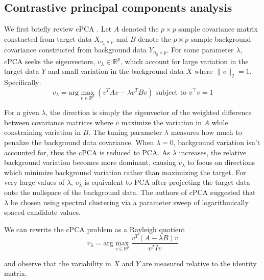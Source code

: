 \documentclass[12pt]{article}
\begin{document}
\subsection{Contrastive principal components analysis}
We first briefly review cPCA \cite{Abid}. Let $A$ denoted the $p\times p$ sample covariance matrix constucted from target data $X_{n_x \times p}$ and $B$ denote the $p\times p$ sample background covariance constructed from background data $Y_{n_y \times p}$. For some parameter $\lambda$, cPCA seeks the eigenvectors, $v_\lambda \in \mathbb{R}^p$, which account for large variation in the target data $Y$ and small variation in the background data $X$ where $\|v\|_2 = 1$. Specifically:  
\[v_\lambda = \text{arg}\max_{v \in \mathbb{R}^p}{\left(v^TAv - \lambda v^TBv\right)} \mbox{ subject to } v^\top  v = 1 \]

For a given $\lambda$, the direction is simply the eigenvector of the weighted difference between covariance matrices where $v$ maximize the variation in $A$ while constraining variation in $B$.
The tuning parameter $\lambda$ measures how much to penalize the background data covariance. When $\lambda = 0$, background variation isn't accounted for, thus the cPCA is reduced to PCA. As $\lambda$ increases, the relative background variation becomes more dominant, causing $v_\lambda$ to focus on directions which minimize background variation rather than maximizing the target. For very large values of $\lambda$, $v_\lambda$ is equivalent to PCA after projecting the target data onto the nullspace of the background data.  The authors of cPCA suggested that $\lambda$ be chosen using spectral clustering via a parameter sweep of logarithmically spaced candidate values.

We can rewrite the cPCA problem as a Rayleigh quotient
\[v_\lambda = \text{arg}\max_{v \in \mathbb{R}^p}{\frac{v^T\left(A - \lambda B\right)v}{v^T I v}}\]

and observe that the variability in $X$ and $Y$ are measured relative to the identity matrix.
\end{document}
